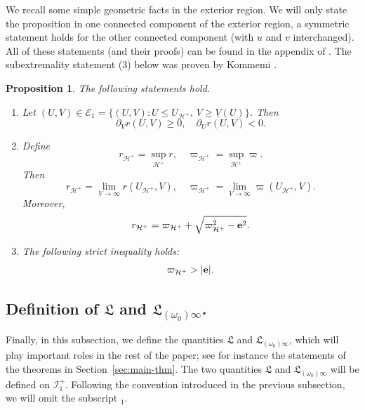 \documentclass[10pt, reqno]{amsart}
\newtheorem{proposition}[theorem]{Proposition}
\theoremstyle{definition}
\theoremstyle{remark}
\theoremstyle{conjecture}
\numberwithin{equation}{section}
\newcommand{\rd}{\partial}
\newcommand{\0}{\emptyset}
\newcommand{\omg}{\omega}
\newcommand{\bfe}{{\bf e}}
\newcommand{\calH}{\mathcal H}
\newcommand{\calI}{\mathcal I}
\newcommand{\EH}{\calH^{+}}
\newcommand{\e}{\bfe}							%
\newcommand{\NI}{\calI^{+}}						%
\newcommand{\Ext}{\mathscr{E}}
\begin{document}
We recall some simple geometric facts in the exterior region. We will only state the proposition in one connected component of the exterior region, a symmetric statement holds for the other connected component (with $u$ and $v$ interchanged). All of these statements (and their proofs) can be found in the appendix of \cite{LO.interior}. The subextremality statement (3) below was proven by Kommemi \cite{KomThe}. 
\begin{proposition}\label{prop.subextremality}
The following statements hold.
\begin{enumerate}
\item Let $(U,V) \in \Ext_{1} = \{(U,V) : U \leq U_{\EH},\, V \geq \underline{V}(U) \}$. Then
\begin{equation}\label{no.trapped.in.1}
\rd_V r (U,V)\geq 0,\quad 
\rd_U r (U, V) < 0.
\end{equation}
\item Define
$$r_{\EH}=\sup_{\EH} r,\quad \varpi_{\EH}=\sup_{\EH} \varpi.$$
Then 
\begin{equation}\label{r.varpi.limits}
r_{\EH}=\lim_{V \to\infty} r(U_{\EH}, V),\quad \varpi_{\EH}=\lim_{V \to\infty} \varpi(U_{\EH}, V).
\end{equation}
Moreover,
\begin{equation}\label{r.varpi.poly}
r_{\EH}=\varpi_{\EH} +\sqrt{\varpi_{\EH}^2-\e^2}.
\end{equation}
\item The following strict inequality holds:
\begin{equation}\label{eq:subextremality}
\varpi_{\EH}>|{\bf e}|.
\end{equation}
\end{enumerate}
\end{proposition}

\subsection{Definition of $\mathfrak L$ and $\mathfrak L_{(\omg_0)\infty}$.}\label{sec:L.Li}

Finally, in this subsection, we define the quantities $\mathfrak L$ and $\mathfrak{L}_{(\omg_0)\infty}$, which will play important roles in the rest of the paper; see for instance the statements of the theorems in Section~\ref{sec:main-thm}. The two quantities $\mathfrak L$ and $\mathfrak{L}_{(\omg_0)\infty}$ will be defined on $\NI_1$. Following the convention introduced in the previous subsection, we will omit the subscript ${ }_1$.
\end{document}
